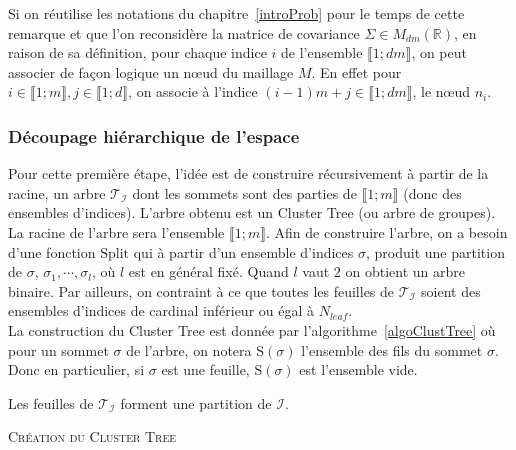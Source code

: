 \begin{remark}
\label{assignIndexLogic}
Si on réutilise les notations du chapitre~\ref{introProb} pour le temps de cette remarque et
que l'on reconsidère la matrice de covariance $\Sigma \in M_{dm}(\mathbb{R})$,
en raison de sa définition, pour chaque indice $i$ de l'ensemble
$\llbracket 1;dm \rrbracket$, on peut associer de façon logique un n\oe ud du maillage $M$.
En effet pour $i \in \llbracket 1; m \rrbracket, j \in \llbracket 1; d \rrbracket$,
on associe à l'indice $(i-1)m + j \in \llbracket 1;dm \rrbracket$, le n\oe ud $n_i$.
\end{remark}
\subsubsection{Découpage hiérarchique de l'espace}
\label{DecoupHieSpace}
\noindent Pour cette première étape, l'idée est de construire récursivement à partir de
la racine, un arbre $\mathcal{T}_{\mathcal{I}}$ dont les sommets sont des parties de $\llbracket 1;m \rrbracket$ (donc des ensembles d'indices).  L'arbre obtenu est un Cluster Tree (ou
arbre de groupes). La racine de l'arbre sera l'ensemble $\llbracket 1;m \rrbracket$. Afin de construire l'arbre, on a besoin d'une fonction
\og $\mathrm{Split}$ \fg{} qui à partir d'un ensemble d'indices $\sigma$, produit une partition de $\sigma$,
$\sigma_1, \cdots, \sigma_l$, où $l$ est en général fixé. Quand $l$ vaut $2$ on obtient un arbre binaire. Par ailleurs, on contraint à ce que toutes
les feuilles de $\mathcal{T}_{\mathcal{I}}$ soient des ensembles d'indices de cardinal
inférieur ou égal à $N_{leaf}$. \\ La construction du Cluster Tree est donnée par l'algorithme~\ref{algoClustTree} où pour
un sommet $\sigma$ de l'arbre, on notera $\mathrm{S}(\sigma)$ l'ensemble des fils
du sommet $\sigma$. Donc en particulier, si $\sigma$ est une feuille, $\mathrm{S}(\sigma)$ est l'ensemble vide.
\begin{remark}
Les feuilles de $\mathcal{T}_{\mathcal{I}}$ forment une partition de $\mathcal{I}$.   
\end{remark}


\begin{algorithm}
\caption{\textsc{Création du Cluster Tree}}
\label{algoClustTree}
\begin{algorithmic}
\STATE {\quad \quad $\cdots$}
\END
\end{algorithmic}
\end{algorithm}

